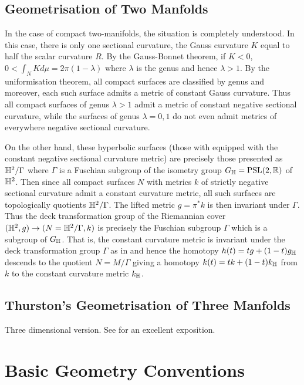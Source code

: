 \documentclass[a4paper, 12pt]{amsart}
\begin{document}
\subsection{Geometrisation of Two Manfolds}
\label{sec:geometrisation_2d}

In the case of compact two-manifolds, the situation is completely understood. In this case, there is only one sectional curvature, the Gauss curvature \(K\) equal to half the scalar curvature \(R\). By the Gauss-Bonnet theorem, if \(K < 0\), \(0 < \int_N K d\mu = 2\pi(1-\lambda)\) where \(\lambda\) is the genus and hence \(\lambda > 1\). By the uniformisation theorem, all compact surfaces are classified by genus and moreover, each such surface admits a metric of constant Gauss curvature. Thus all compact surfaces of genus \(\lambda > 1\) admit a metric of constant negative sectional curvature, while the surfaces of genus \(\lambda = 0, 1\) do not even admit metrics of everywhere negative sectional curvature.

On the other hand, these hyperbolic surfaces (those with equipped with the constant negative sectional curvature metric) are precisely those presented as \(\mathbb{H}^2/\Gamma\) where \(\Gamma\) is a Fuschian subgroup of the isometry group \(G_{\mathbb{H}} = \text{PSL}(2, \mathbb{R})\) of \(\mathbb{H}^2\). Then since all compact surfaces \(N\) with metrics \(k\) of strictly negative sectional curvature admit a constant curvature metric, all such surfaces are topologically quotients \(\mathbb{H}^2/\Gamma\). The lifted metric \(g = \pi^{\ast} k\) is then invariant under \(\Gamma\). Thus the deck transformation group of the Riemannian cover \((\mathbb{H}^2, g) \to (N = \mathbb{H}^2/\Gamma, k)\) is precisely the Fuschian subgroup \(\Gamma\) which is a subgroup of \(G_{\mathbb{H}}\). That is, the constant curvature metric is invariant under the deck transformation group \(\Gamma\) as in  and hence the homotopy \(h(t) = t g + (1-t)g_{\mathbb{H}}\) descends to the quotient \(N = M/\Gamma\) giving a homotopy \(k(t) = t k + (1-t)k_{\mathbb{H}}\) from \(k\) to the constant curvature metric \(k_{\mathbb{H}}\).

\subsection{Thurston's Geometrisation of Three Manfolds}
\label{sec:geometrisation_3d}

{\color{red} Three dimensional version. See \cite{MR705527} for an excellent exposition.}


\section{Basic Geometry Conventions}
\label{sec:notation}
\end{document}

